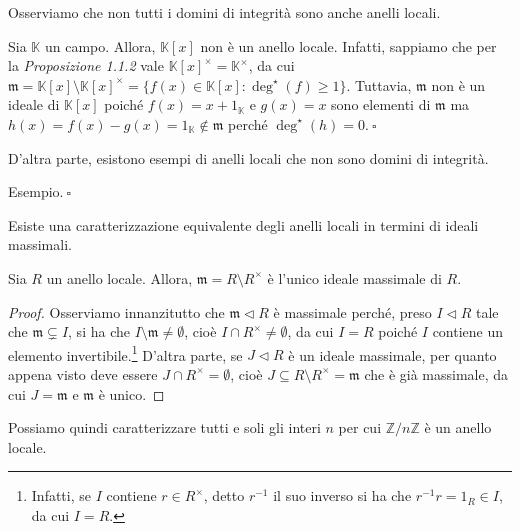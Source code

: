\noindent Osserviamo che non tutti i domini di integrità sono anche anelli locali.

\begin{exm}Sia $\mathbb{K}$ un campo. Allora, $\mathbb{K}[x]$ non è un anello locale. Infatti, sappiamo che per la \emph{Proposizione 1.1.2} vale $\mathbb{K}[x]^{\times}=\mathbb{K}^{\times}$, da cui $\mathfrak{m}=\mathbb{K}[x]\setminus\mathbb{K}[x]^{\times}=\{f(x)\in \mathbb{K}[x]: \deg^{\star}(f)\geq 1\}$. Tuttavia, $\mathfrak{m}$ non è un ideale di $\mathbb{K}[x]$ poiché $f(x)=x+1_{\mathbb{K}}$ e $g(x)=x$ sono elementi di $\mathfrak{m}$ ma $h(x)=f(x)-g(x)=1_{\mathbb{K}}\not\in \mathfrak{m}$ perché $\deg^{\star}(h)=0. \ \square$\end{exm}

\noindent D'altra parte, esistono esempi di anelli locali che non sono domini di integrità.

\begin{exm}Esempio$. \ \square$\end{exm}

\noindent Esiste una caratterizzazione equivalente degli anelli locali in termini di ideali massimali.

\begin{prop}[1.7.8]{}
Sia $R$ un anello locale. Allora, $\mathfrak{m}=R\setminus R^{\times}$ è l'unico ideale massimale di $R$.
\end{prop}
\vspace{-4mm}
\begin{proof}
Osserviamo innanzitutto che $\mathfrak{m}\lhd R$ è massimale perché, preso $I\lhd R$ tale che $\mathfrak{m} \varsubsetneq I$, si ha che $I\setminus \mathfrak{m}\neq \emptyset$, cioè $I\cap R^{\times}\neq \emptyset$, da cui $I=R$ poiché $I$ contiene un elemento invertibile.\footnote{Infatti, se $I$ contiene $r\in R^{\times}$, detto $r^{-1}$ il suo inverso si ha che $r^{-1}r=1_R\in I$, da cui $I=R$.} D'altra parte, se $J\lhd R$ è un ideale massimale, per quanto appena visto deve essere $J\cap R^{\times}=\emptyset$, cioè $J\subseteq R\setminus R^{\times}=\mathfrak{m}$ che è già massimale, da cui $J=\mathfrak{m}$ e $\mathfrak{m}$ è unico.
\end{proof}

\clearpage

\noindent Possiamo quindi caratterizzare tutti e soli gli interi $n$ per cui $\mathbb{Z}/n\mathbb{Z}$ è un anello locale.


